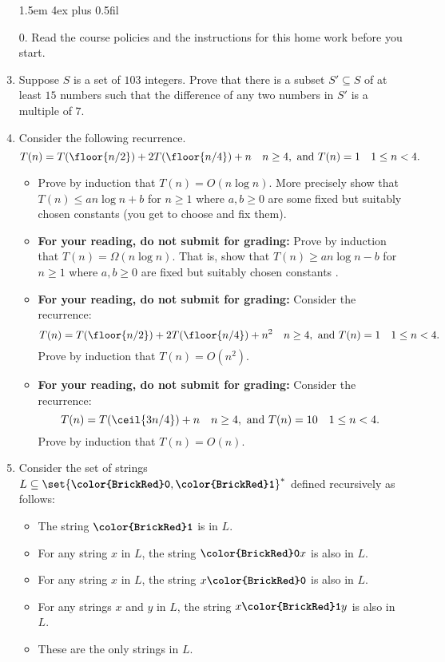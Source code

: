 \documentclass[11pt]{article}
\def\Sym#1{\textbf{\texttt{\color{BrickRed}#1}}}
\begin{document}
\begin{enumerate}
\parindent 1.5em \itemsep 4ex plus 0.5fil

\item[0.] Read the course policies and the instructions for this home work
before you start.

\item Suppose $S$ is a set of $103$ integers. Prove that there is a
    subset $S' \subseteq S$ of at least $15$ numbers such that 
    the difference of any two numbers in $S'$ is a multiple of $7$.
\item Consider the following recurrence.
$$T(n) = T(\floor{n/2}) + 2T(\floor{n/4}) + n \quad n \ge 4, \mbox{~and~} T(n) = 1 \quad 1 \le n < 4. $$
\begin{itemize}
\item Prove by induction that $T(n) = O(n \log n)$.
More precisely show that $T(n) \le a n \log n + b$ for $n \ge 1$ where
$a,b \ge 0$ are some fixed but suitably chosen constants (you get to choose and fix them).

\item {\bf For your reading, do not submit for grading:} Prove by induction that $T(n) = \Omega(n \log n)$. That is, show
  that $T(n) \ge a n \log n - b$  for $n \ge 1$ where $a,b \ge 0$ are fixed but
  suitably chosen constants .

\item {\bf For your reading, do not submit for grading:} Consider the recurrence:
$$T(n) = T(\floor{n/2}) + 2T(\floor{n/4}) + n^2 \quad n \ge 4, \mbox{~and~} T(n) = 1 \quad 1 \le n < 4.$$
Prove by induction that $T(n) = O(n^2)$.
\item {\bf For your reading, do not submit for grading:} Consider the recurrence:
$$T(n) = T(\ceil{3n/4}) + n \quad n \ge 4, \mbox{~and~} T(n) = 10 \quad 1 \le n < 4.$$
Prove by induction that $T(n) = O(n)$.
\end{itemize}

\item Consider the set of strings $L \subseteq \set{\Sym0,\Sym1}^*$
  defined recursively as follows:
\begin{itemize}
\item The string $\Sym1$ is in $L$.
\item For any string $x$ in $L$, the string $\Sym0 x$ is also in $L$.
\item For any string $x$ in $L$, the string $x \Sym0$ is also in $L$.
\item For any strings $x$ and $y$ in $L$, the string $x \Sym1 y$ is also in $L$.
\item These are the only strings in $L$.
\end{itemize}


\end{enumerate}
\end{document}
